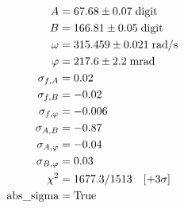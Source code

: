\documentclass{article}[a4paper, oneside ,11pt]
\begin{document}
\begin{align*}
A &= 67.68 \pm 0.07 \; \rm digit \\
B &= 166.81 \pm 0.05 \; \rm digit \\
\omega &= 315.459 \pm 0.021 \; \rm rad/s \\  
\phi &= 217.6 \pm 2.2 \; \rm m rad \\
\sigma_{f, A} &= 0.02 \\   
\sigma_{f, B} &= -0.02 \\
\sigma_{f, \phi} &= -0.006 \\
\sigma_{A, B} &= -0.87 \\
\sigma_{A, \phi} &= -0.04 \\   
\sigma_{B, \phi} &= 0.03 \\
\chi^2 &= 1677.3/1513 \quad [+ 3 \sigma] \\
\text{abs\_sigma} &= \rm True
\end{align*}
\fi
\end{document}
